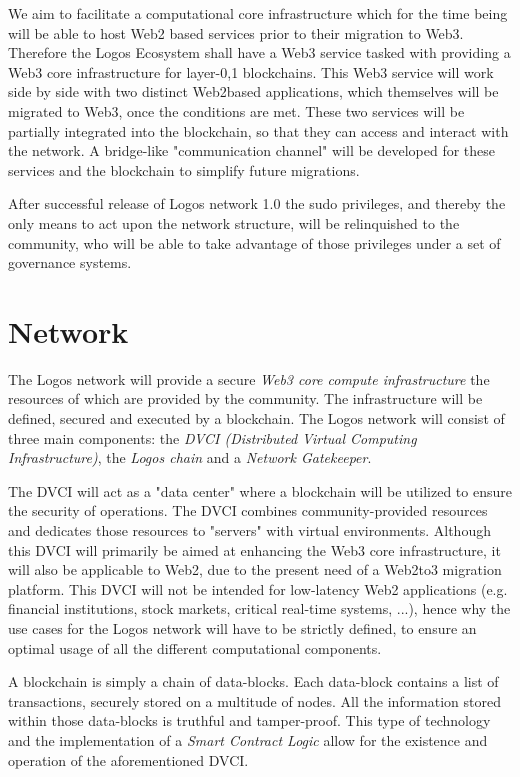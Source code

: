 \documentclass[]{article}
\begin{document}
We aim to facilitate a computational core infrastructure which for the time being will be able to host Web2 based services prior to their migration to Web3. 
Therefore the Logos Ecosystem shall have a Web3 service tasked with providing a Web3 core infrastructure for layer-0,1 blockchains. 
This Web3 service will work side by side with two distinct Web2based applications, which themselves will be migrated to Web3, once the conditions are met.
These two services will be partially integrated into the blockchain, so that they can access and interact with the network.
A bridge-like "communication channel" will be developed for these services and the blockchain to simplify future migrations.

After successful release of Logos network 1.0 the sudo privileges, and thereby the only means to act upon the network structure, will be relinquished to the community, who will be able to take advantage of those privileges under a set of governance systems. 

\section{Network}
The Logos network will provide a secure \textit{Web3 core compute infrastructure} the resources of which are provided by the community. 
The infrastructure will be defined, secured and executed by a blockchain.
The Logos network will consist of three main components: the \textit{DVCI (Distributed Virtual Computing Infrastructure)}, the \textit{Logos chain} and a \textit{Network Gatekeeper}. 

The DVCI will act as a "data center" where a blockchain will be utilized to ensure the security of operations.
The DVCI combines community-provided resources and dedicates those resources to "servers" with virtual environments.
Although this DVCI will primarily be aimed at enhancing the Web3 core infrastructure, it will also be applicable to Web2, due to the present need of a Web2to3 migration platform.
This DVCI will not be intended for low-latency Web2 applications (e.g. financial institutions, stock markets, critical real-time systems, ...), hence why the use cases for the Logos network will have to be strictly defined, to ensure an optimal usage of all the different computational components.  

A blockchain is simply a chain of data-blocks.
Each data-block contains a list of transactions, securely stored on a multitude of nodes. 
All the information stored within those data-blocks is truthful and tamper-proof.
This type of technology and the implementation of a \textit{Smart Contract Logic} allow for the existence and operation of the aforementioned DVCI.
\end{document}
